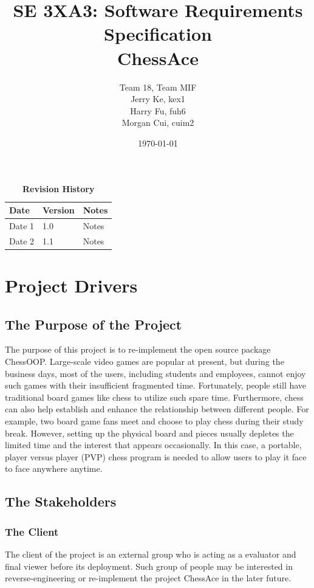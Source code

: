 \documentclass[12pt, titlepage]{article}
\title{SE 3XA3: Software Requirements Specification\\ChessAce}
\author{Team 18, Team MIF
		\\ Jerry Ke,  kex1
		\\ Harry Fu, fuh6
		\\ Morgan Cui, cuim2
}
\date{\today}
\begin{document}
\maketitle

\tableofcontents
\listoftables
\listoffigures

\begin{table}[bp]
\caption{\bf Revision History}
\begin{tabularx}{\textwidth}{p{3cm}p{2cm}X}
\toprule {\bf Date} & {\bf Version} & {\bf Notes}\\
\midrule
Date 1 & 1.0 & Notes\\
Date 2 & 1.1 & Notes\\
\bottomrule
\end{tabularx}
\end{table}

\newpage


\section{Project Drivers}

\subsection{The Purpose of the Project}
The purpose of this project is to re-implement the open source package ChessOOP. Large-scale video games are popular at present, but during the business days, most of the users, including students and employees, cannot enjoy such games with their insufficient fragmented time. Fortunately, people still have traditional board games like chess to utilize such spare time. Furthermore, chess can also help establish and enhance the relationship between different people. For example, two board game fans meet and choose to play chess during their study break. However, setting up the physical board and pieces usually depletes the limited time and the interest that appears occasionally. In this case, a portable, player versus player (PVP) chess program is needed to allow users to play it face to face anywhere anytime.

\subsection{The Stakeholders}

\subsubsection{The Client}
The client of the project is an external group who is acting as a evaluator and final viewer before its deployment. Such group of people may be interested in reverse-engineering or re-implement the project ChessAce in the later future.
\end{document}
